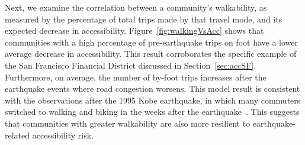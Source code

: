 {%


Next, we examine the correlation between a community's walkability, as measured by the percentage of total trips made by that travel mode, and its expected decrease in accessibility. Figure~\ref{fig:walkingVsAcc} shows that communities with a high percentage of pre-earthquake trips on foot have a lower average decrease in accessibility. This result corroborates the specific example of the San Francisco Financial District discussed in Section~\ref{sec:accSF}. Furthermore,  on average, the number of by-foot trips increases after the earthquake events where road congestion worsens. This model result is consistent with the observations after the 1995 Kobe earthquake, in which many commuters switched to walking and biking in the weeks after the earthquake~\cite{gordon_transport-related_1998}. This suggests that communities with greater walkability are also more resilient to earthquake-related accessibility risk. 

}
